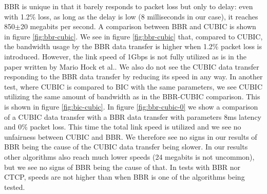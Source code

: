 \documentclass{article}
\begin{document}
BBR is unique in that it barely responds to packet loss but only to delay: even
with 1.2\% loss, as long as the delay is low (8 milliseconds in our case), it
reaches 850$\pm$20 megabits per second. A comparison between BBR and CUBIC is shown in figure \ref{fig:bbr-cubic}. We see in figure \ref{fig:bbr-cubic} that, compared to CUBIC, the bandwidth usage by the BBR data transfer is higher when 1.2\% packet loss is introduced. However, the link speed of 1Gbps is not fully utilized as is in the paper written by Mario Hock et al.\cite{bbr-congestion-comparison}. We also do not see the CUBIC data transfer responding to the BBR data transfer by reducing its speed in any way. In another test, where CUBIC is compared to BIC with the same parameters, we see CUBIC utilizing the same amount of bandwidth as in the BBR-CUBIC comparison. This is shown in figure \ref{fig:bic-cubic}. In figure \ref{fig:bbr-cubic-0} we show a comparison of a CUBIC data transfer with a BBR data transfer with parameters 8ms latency and 0\% packet loss. This time the total link speed is utilized and we see no unfairness between CUBIC and BBR. We therefore see no signs in our results of BBR being the cause of the CUBIC data transfer being slower. In our results other algorithms also reach much lower
speeds (24 megabits is not uncommon), but we see no signs of BBR being the
cause of that. In tests with BBR nor CTCP, speeds are not higher than when BBR
is one of the algorithms being tested.
\end{document}
